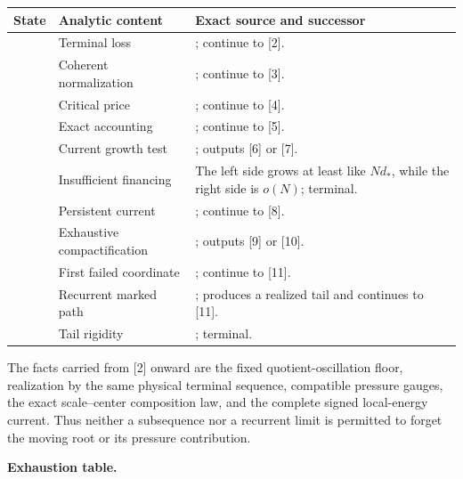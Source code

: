 \documentclass[11pt]{amsart}
\numberwithin{equation}{section}
\theoremstyle{plain}
\theoremstyle{definition}
\theoremstyle{remark}
\begin{document}
\begin{center}
\small
\begin{tabular}{@{}L{0.09\textwidth}L{0.32\textwidth}L{0.46\textwidth}@{}}
\toprule
State & Analytic content & Exact source and successor \\
\midrule\relax
[1] & Terminal loss & ; continue to [2]. \\\relax
[2] & Coherent normalization & ; continue to [3]. \\\relax
[3] & Critical price & ; continue to [4]. \\\relax
[4] & Exact accounting & ; continue to [5]. \\\relax
[5] & Current growth test & ; outputs [6] or [7]. \\\relax
[6] & Insufficient financing & The left side grows at least like \(Nd_*\), while the right side is \(o(N)\); terminal. \\\relax
[7] & Persistent current & ; continue to [8]. \\\relax
[8] & Exhaustive compactification & ; outputs [9] or [10]. \\\relax
[9] & First failed coordinate & ; continue to [11]. \\\relax
[10] & Recurrent marked path & ; produces a realized tail and continues to [11]. \\\relax
[11] & Tail rigidity & ; terminal. \\
\bottomrule
\end{tabular}
\end{center}

The facts carried from [2] onward are the fixed quotient-oscillation floor,
realization by the same physical terminal sequence, compatible pressure
gauges, the exact scale--center composition law, and the complete signed
local-energy current.  Thus neither a subsequence nor a recurrent limit is
permitted to forget the moving root or its pressure contribution.

\medskip\noindent\textbf{Exhaustion table.}\par\smallskip
\end{document}
